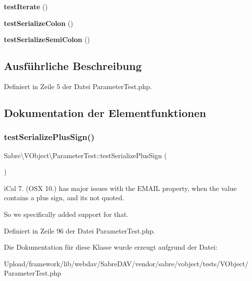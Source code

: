\begin{DoxyCompactItemize}
\mbox{\label{class_sabre_1_1_v_object_1_1_parameter_test_a501480fb7f3588bb623aa03b57b0ff01}} 
{\bfseries test\+Iterate} ()
\item 
\mbox{\label{class_sabre_1_1_v_object_1_1_parameter_test_ac9a1a52bf3dd0eecad986cf4a0ea0710}} 
{\bfseries test\+Serialize\+Colon} ()
\item 
\mbox{\label{class_sabre_1_1_v_object_1_1_parameter_test_a368d25d94cd1861a923a9360b642c8b5}} 
{\bfseries test\+Serialize\+Semi\+Colon} ()
\end{DoxyCompactItemize}


\subsection{Ausführliche Beschreibung}


Definiert in Zeile 5 der Datei Parameter\+Test.\+php.



\subsection{Dokumentation der Elementfunktionen}
\mbox{\label{class_sabre_1_1_v_object_1_1_parameter_test_ae308053635ab6029ed3a4c2f461b36e7}} 
\subsubsection{\texorpdfstring{test\+Serialize\+Plus\+Sign()}{testSerializePlusSign()}}
{\footnotesize\ttfamily Sabre\textbackslash{}\+V\+Object\textbackslash{}\+Parameter\+Test\+::test\+Serialize\+Plus\+Sign (\begin{DoxyParamCaption}{ }\end{DoxyParamCaption})}

i\+Cal 7. (O\+SX 10.) has major issues with the E\+M\+A\+IL property, when the value contains a plus sign, and it\textquotesingle{}s not quoted.

So we specifically added support for that. 

Definiert in Zeile 96 der Datei Parameter\+Test.\+php.



Die Dokumentation für diese Klasse wurde erzeugt aufgrund der Datei\+:\begin{DoxyCompactItemize}
\item 
Upload/framework/lib/webdav/\+Sabre\+D\+A\+V/vendor/sabre/vobject/tests/\+V\+Object/Parameter\+Test.\+php\end{DoxyCompactItemize}
